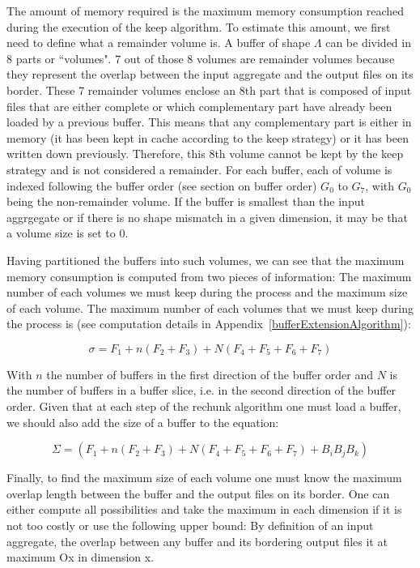 \documentclass[conference]{IEEEtran}
\begin{document}
The amount of memory required is the maximum memory consumption reached during
the execution of the keep algorithm. To estimate this amount, we first need to
define what a remainder volume is. A buffer of shape $\Lambda$ can be divided in
8 parts or ``volumes". 7 out of those 8 volumes are remainder volumes because
they represent the overlap between the input aggregate and the output files on
its border. These 7 remainder volumes enclose an 8th part that is composed of
input files that are either complete or which complementary part have already
been loaded by a previous buffer. This means that any complementary part is either
in memory (it has been kept in cache according to the keep strategy) or it has
been written down previously. Therefore, this 8th volume cannot be kept by the
keep strategy and is not considered a remainder. For each buffer, each of volume
is indexed following the buffer order (see section on buffer order) $G_0$ to $G_7$, with
$G_0$ being the non-remainder volume. If the buffer is smallest than the input
aggrgegate or if there is no shape mismatch in a given dimension, it may be that
a volume size is set to 0.

Having partitioned the buffers into such volumes, we can see that the maximum
memory consumption is computed from two pieces of information: The maximum number
of each volumes we must keep during the process and the maximum size of each
volume. The maximum number of each volumes that we must keep during the process
is (see computation details in Appendix~\ref{bufferExtensionAlgorithm}):

\begin{equation} \label{eq:2}
\sigma = F_1 + n(F_2 + F_3) + N(F_4 + F_5 + F_6 + F_7)
\end{equation}

With $n$ the number of buffers in the first direction of the buffer order and
$N$ is the number of buffers in a buffer slice, i.e. in the second direction of
the buffer order. Given that at each step of the rechunk algorithm one must
load a buffer, we should also add the size of a buffer to the equation:

\begin{equation} \label{eq:3}
\Sigma = (F_1 + n(F_2 + F_3) + N(F_4 + F_5 + F_6 + F_7) + B_iB_jB_k)
\end{equation}

Finally, to find the maximum size of each volume one must know the maximum
overlap length between the buffer and the output files on its border. One can
either compute all possibilities and take the maximum in each dimension if it is
not too costly or use the following upper bound: By definition of an input
aggregate, the overlap between any buffer and its bordering output files it at
maximum Ox in dimension x.
\end{document}
